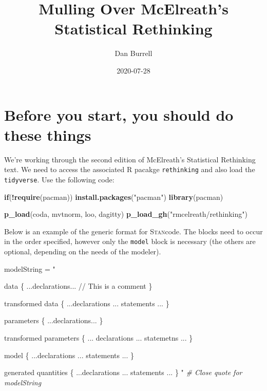\documentclass[
]{book}
\title{Mulling Over McElreath's Statistical Rethinking}
\author{Dan Burrell}
\date{2020-07-28}
\newenvironment{Shaded}{\begin{snugshade}}{\end{snugshade}}
\newcommand{\CommentTok}[1]{\textcolor[rgb]{0.56,0.35,0.01}{\textit{#1}}}
\newcommand{\ControlFlowTok}[1]{\textcolor[rgb]{0.13,0.29,0.53}{\textbf{#1}}}
\newcommand{\KeywordTok}[1]{\textcolor[rgb]{0.13,0.29,0.53}{\textbf{#1}}}
\newcommand{\NormalTok}[1]{#1}
\newcommand{\OperatorTok}[1]{\textcolor[rgb]{0.81,0.36,0.00}{\textbf{#1}}}
\newcommand{\StringTok}[1]{\textcolor[rgb]{0.31,0.60,0.02}{#1}}
\newcommand{\stan}{\textsc{Stan}}
\begin{document}
\maketitle

{
\setcounter{tocdepth}{1}
\tableofcontents
}
\hypertarget{before-you-start-you-should-do-these-things}{%
\chapter{Before you start, you should do these things}\label{before-you-start-you-should-do-these-things}}

We're working through the second edition of McElreath's Statistical Rethinking text. We need to access the associated R pacakge \texttt{rethinking} and also load the \texttt{tidyverse}. Use the following code:

\begin{Shaded}
\begin{Highlighting}[]
\ControlFlowTok{if}\NormalTok{(}\OperatorTok{!}\KeywordTok{require}\NormalTok{(pacman)) }\KeywordTok{install.packages}\NormalTok{(}\StringTok{"pacman"}\NormalTok{)}
\KeywordTok{library}\NormalTok{(pacman)}

\KeywordTok{p_load}\NormalTok{(coda, mvtnorm, loo, dagitty)}
\KeywordTok{p_load_gh}\NormalTok{(}\StringTok{"rmcelreath/rethinking"}\NormalTok{)}
\end{Highlighting}
\end{Shaded}

Below is an example of the generic format for \stan code. The blocks need to occur in the order specified, however only the \texttt{model} block is necessary (the others are optional, depending on the needs of the modeler).

\begin{Shaded}
\begin{Highlighting}[]
\NormalTok{modelString =}\StringTok{ "}

\StringTok{    data \{}
\StringTok{        ...declarations... // This is a comment}
\StringTok{    \}}

\StringTok{    transformed data \{}
\StringTok{        ...declarations ... statements ...}
\StringTok{    \}}

\StringTok{    parameters \{}
\StringTok{        ...declarations...}
\StringTok{    \}}

\StringTok{    transformed parameters \{}
\StringTok{        ... declarations ... statemetns ...}
\StringTok{    \}}

\StringTok{    model \{}
\StringTok{        ...declarations ... statements ...}
\StringTok{    \}}

\StringTok{    generated quantities \{}
\StringTok{        ...declarations ... statements ...}
\StringTok{    \}}
\StringTok{"} \CommentTok{# Close quote for modelString}
\end{Highlighting}
\end{Shaded}
\end{document}
